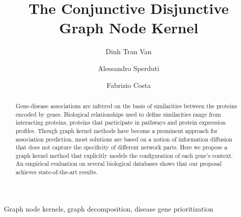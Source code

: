\documentclass[review]{elsarticle}
\begin{document}
\begin{frontmatter}

\title{The Conjunctive Disjunctive Graph Node Kernel}

\author{Dinh Tran Van}
\author{Alessandro Sperduti}
\address{Department of Mathematics, Padova University, Trieste, 63, 35121 Padova, Italy}
\author{Fabrizio Costa}
\address{Department of Computer Science, University of Exeter Exeter EX4 4QF, UK}




\begin{abstract}
Gene-disease associations are inferred on the basis of similarities between the proteins encoded by genes. Biological relationships used to define similarities range from interacting proteins, proteins that participate in pathways and protein expression profiles. Though graph kernel methods have become a prominent approach for association prediction, most solutions are based on a notion of information diffusion that does not capture the specificity of different network parts. Here we propose a graph kernel method that explicitly models the configuration of each gene's context. An empirical evaluation on several biological databases shows that our proposal achieves state-of-the-art results.
\end{abstract}

\begin{keyword}
Graph node kernels, graph decomposition, disease gene prioritization
\end{keyword}
\end{frontmatter}

\linenumbers
\end{document}
